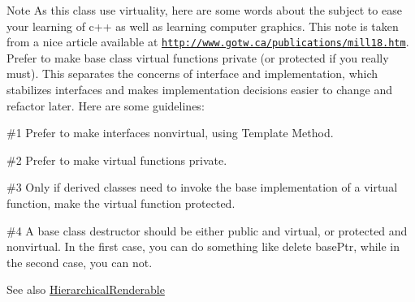 \begin{DoxyNote}{Note}
As this class use virtuality, here are some words about the subject to ease your learning of c++ as well as learning computer graphics. This note is taken from a nice article available at \href{http://www.gotw.ca/publications/mill18.htm}{\tt http\+://www.\+gotw.\+ca/publications/mill18.\+htm}. Prefer to make base class virtual functions private (or protected if you really must). This separates the concerns of interface and implementation, which stabilizes interfaces and makes implementation decisions easier to change and refactor later. Here are some guidelines\+: \begin{DoxyItemize}
\item \#1 Prefer to make interfaces nonvirtual, using Template Method. \item \#2 Prefer to make virtual functions private. \item \#3 Only if derived classes need to invoke the base implementation of a virtual function, make the virtual function protected. \item \#4 A base class destructor should be either public and virtual, or protected and nonvirtual. In the first case, you can do something like {\ttfamily  delete base\+Ptr}, while in the second case, you can not.\end{DoxyItemize}

\end{DoxyNote}
\begin{DoxySeeAlso}{See also}
\hyperlink{classHierarchicalRenderable}{Hierarchical\+Renderable} 
\end{DoxySeeAlso}


